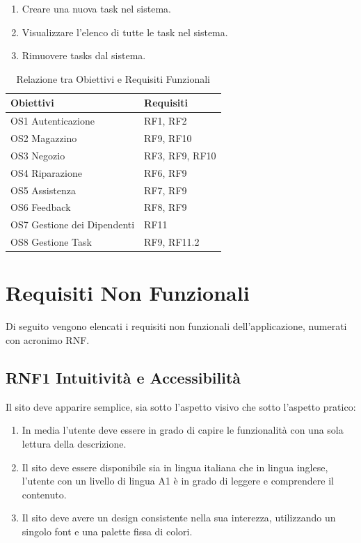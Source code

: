 \documentclass{report}
\begin{document}
\begin{enumerate}
	\item Creare una nuova task nel sistema.
	\item Visualizzare l'elenco di tutte le task nel sistema.
	\item Rimuovere tasks dal sistema.
\end{enumerate}

\begin{table}[h]
\begin{center} %
	\centering
	\begin{tabular}{ |p{4cm}|p{4cm}|  }
		\hline
		\centering Obiettivi & \qquad\qquad Requisiti \\ %
		\hline
		OS1 Autenticazione & RF1, RF2 \\
		\hline
		OS2 Magazzino & RF9, RF10 \\
		\hline
		OS3 Negozio &
		RF3, RF9, RF10 \\
		\hline
		OS4 Riparazione & RF6, RF9\\
		\hline
		OS5 Assistenza & RF7, RF9 \\
		\hline
		OS6 Feedback & RF8, RF9 \\
		\hline
		OS7 Gestione dei Dipendenti & RF11 \\
		\hline
		OS8 Gestione Task & RF9, RF11.2 \\
		\hline
	\end{tabular}
\caption{Relazione tra Obiettivi e Requisiti Funzionali}
\end{center}
\end{table}

\pagebreak


\section{Requisiti Non Funzionali}
Di seguito vengono elencati i requisiti non funzionali dell’applicazione, numerati con acronimo RNF.

\subsection*{RNF1 Intuitività e Accessibilità}
Il sito deve apparire semplice, sia sotto l'aspetto visivo che sotto l'aspetto pratico:
\begin{enumerate}
	\item In media l’utente deve essere in grado di capire le funzionalità con una sola lettura della descrizione.
	\item Il sito deve essere disponibile sia in lingua italiana che in lingua inglese, l’utente con un livello di lingua A1 è in grado di leggere e comprendere il contenuto.
	\item Il sito deve avere un design consistente nella sua interezza, utilizzando un singolo font e una palette fissa di colori.
\end{enumerate}
\end{document}
